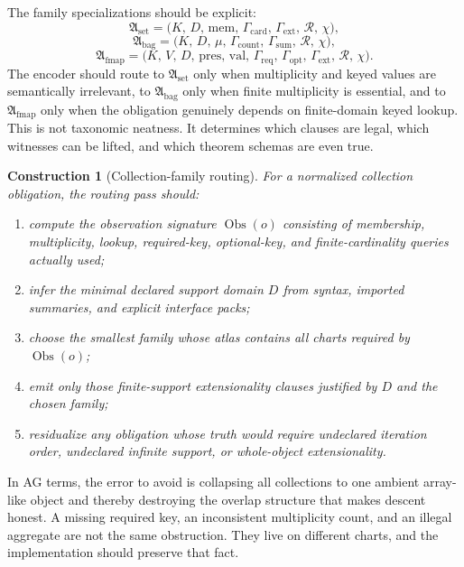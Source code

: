 \documentclass[11pt]{report}
\newtheorem{construction}[definition]{Construction}
\begin{document}
The family specializations should be explicit:
\[
\mathfrak{A}_{\mathrm{set}}
=
\bigl(
K,\,
D,\,
\mathrm{mem},\,
\Gamma_{\mathrm{card}},\,
\Gamma_{\mathrm{ext}},\,
\mathcal{R},\,
\chi
\bigr),
\]
\[
\mathfrak{A}_{\mathrm{bag}}
=
\bigl(
K,\,
D,\,
\mu,\,
\Gamma_{\mathrm{count}},\,
\Gamma_{\mathrm{sum}},\,
\mathcal{R},\,
\chi
\bigr),
\]
\[
\mathfrak{A}_{\mathrm{fmap}}
=
\bigl(
K,\,
V,\,
D,\,
\mathrm{pres},\,
\mathrm{val},\,
\Gamma_{\mathrm{req}},\,
\Gamma_{\mathrm{opt}},\,
\Gamma_{\mathrm{ext}},\,
\mathcal{R},\,
\chi
\bigr).
\]
The encoder should route to $\mathfrak{A}_{\mathrm{set}}$ only when multiplicity and keyed values are semantically irrelevant, to $\mathfrak{A}_{\mathrm{bag}}$ only when finite multiplicity is essential, and to $\mathfrak{A}_{\mathrm{fmap}}$ only when the obligation genuinely depends on finite-domain keyed lookup. This is not taxonomic neatness. It determines which clauses are legal, which witnesses can be lifted, and which theorem schemas are even true.

\begin{construction}[Collection-family routing]
For a normalized collection obligation, the routing pass should:
\begin{enumerate}
\item compute the observation signature $\operatorname{Obs}(o)$ consisting of membership, multiplicity, lookup, required-key, optional-key, and finite-cardinality queries actually used;
\item infer the minimal declared support domain $D$ from syntax, imported summaries, and explicit interface packs;
\item choose the smallest family whose atlas contains all charts required by $\operatorname{Obs}(o)$;
\item emit only those finite-support extensionality clauses justified by $D$ and the chosen family;
\item residualize any obligation whose truth would require undeclared iteration order, undeclared infinite support, or whole-object extensionality.
\end{enumerate}
\end{construction}

In AG terms, the error to avoid is collapsing all collections to one ambient array-like object and thereby destroying the overlap structure that makes descent honest. A missing required key, an inconsistent multiplicity count, and an illegal aggregate are not the same obstruction. They live on different charts, and the implementation should preserve that fact.
\end{document}
